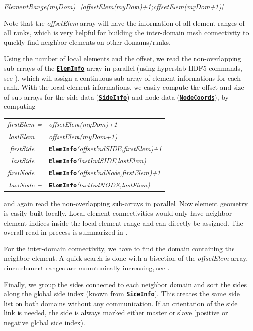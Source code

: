 \documentclass[a4paper,headsepline]{scrreprt}
\newcommand\rf[1]{\prettyref{#1}}
\newcommand\ttbf[1]{\texttt{\textbf{#1}}}
\newcommand\ElemInfo{\hyperlink{ElemInfo}{\ttbf{ElemInfo}}\xspace}
\newcommand\SideInfo{\hyperlink{SideInfo}{\ttbf{SideInfo}}\xspace}
\newcommand\NodeCoords{\hyperlink{NodeInfo}{\ttbf{NodeCoords}}\xspace}
\begin{document}
\textit{ElementRange(myDom)=[offsetElem(myDom)+1;offsetElem(myDom+1)]}

Note that the \textit{offsetElem} array will have the information of all element ranges of all ranks, which is very helpful for building the inter-domain mesh connectivity to quickly find neighbor elements on other domains/ranks.

Using the number of local elements and the offset, we read the non-overlapping sub-arrays of the \ElemInfo array in parallel (using hyperslab HDF5 commands, see \rf{alg:hdfarray}), which will assign a continuous sub-array of element informations for each rank. With the local element informations, we easily compute the offset and size of sub-arrays for the side data (\SideInfo) and node data (\NodeCoords), by computing

\begin{tabular}{rl}
\textit{firstElem =} & \textit{offsetElem(myDom)+1} \\
\textit{ lastElem =} & \textit{offsetElem(myDom+1)} \\[2ex]
\textit{firstSide =}&\ElemInfo\textit{(offsetIndSIDE,firstElem)+1 } \\ 
\textit{ lastSide =}& \ElemInfo\textit{(lastIndSIDE,lastElem) } \\[2ex]
\textit{firstNode =}& \ElemInfo\textit{(offsetIndNode,firstElem)+1 } \\ 
\textit{ lastNode =}& \ElemInfo\textit{(lastIndNODE,lastElem) } \\
\end{tabular}

and again read the non-overlapping sub-arrays in parallel. Now element geometry is easily built locally. Local element connectivities would only have neighbor element indices inside the local element range and can directly be assigned. The overall read-in process is summarized in \rf{alg:readmesh}.

For the inter-domain connectivity, we have to find the domain containing the neighbor element. A quick search is done with a bisection of the \textit{offsetElem} array, since element ranges are monotonically increasing, see \rf{alg:elemID}.

Finally, we group the sides connected to each neighbor domain and sort the sides along the global side index (known from \SideInfo). This creates the same side list on both domains without any communication. If an orientation of the side link is needed, the side is always marked either master or slave (positive or negative global side index).
\end{document}
